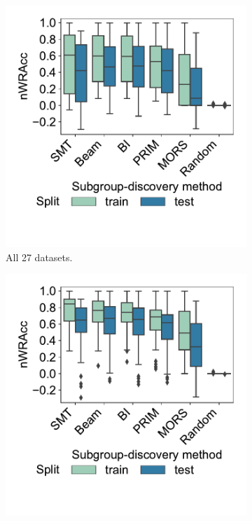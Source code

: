 \documentclass{article}
\theoremstyle{definition}
\begin{document}
\begin{figure}[t]
	\centering
	\begin{subfigure}[t]{0.48\textwidth}
		\centering
		\includegraphics[width=\textwidth, trim=15 55 15 15, clip]{plots/csd-unconstrained-nwracc-all-datasets.pdf}
		\caption{All 27 datasets.}
		\label{fig:csd:unconstrained-nwracc-all-datasets}
	\end{subfigure}
	\hfill
	\begin{subfigure}[t]{0.48\textwidth}
		\centering
		\includegraphics[width=\textwidth, trim=15 55 15 15, clip]{plots/csd-unconstrained-nwracc-no-timeout-datasets.pdf}

\end{subfigure}
\end{figure}
\end{document}
